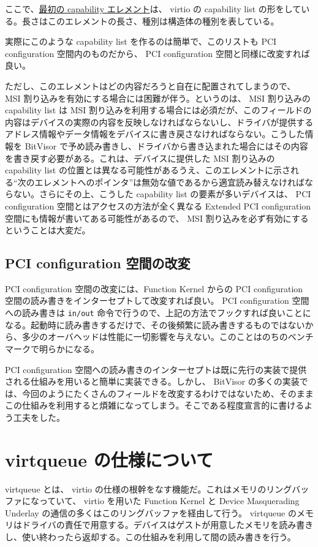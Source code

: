 \documentclass[a4paper,11pt,report]{ltjsbook}
\begin{document}
ここで、\hyperlink{cap1}{最初の capability エレメント}は、 virtio の capability list の形をしている。長さはこのエレメントの長さ、種別は構造体の種別を表している。

実際にこのような capability list を作るのは簡単で、このリストも PCI configuration 空間内のものだから、 PCI configuration 空間と同様に改変すれば良い。

ただし、このエレメントはどの内容だろうと自在に配置されてしまうので、 MSI 割り込みを有効にする場合には困難が伴う。というのは、 MSI 割り込みの capability list は MSI 割り込みを利用する場合には必須だが、このフィールドの内容はデバイスの実際の内容を反映しなければならないし、ドライバが提供するアドレス情報やデータ情報をデバイスに書き戻さなければならない。こうした情報を BitVisor で予め読み書きし、ドライバから書き込まれた場合にはその内容を書き戻す必要がある。これは、デバイスに提供した MSI 割り込みの capability list の位置とは異なる可能性があるうえ、このエレメントに示される``次のエレメントへのポインタ''は無効な値であるから適宜読み替えなければならない。さらにその上、こうした capability list の要素が多いデバイスは、 PCI configuration 空間とはアクセスの方法が全く異なる Extended PCI configuration 空間にも情報が書いてある可能性があるので、 MSI 割り込みを必ず有効にするということは大変だ。

\subsection{PCI configuration 空間の改変}

PCI configuration 空間の改変には、Function Kernel からの PCI configuration 空間の読み書きをインターセプトして改変すれば良い。 PCI configuration 空間への読み書きは \texttt{in/out} 命令で行うので、上記の方法でフックすれば良いことになる。起動時に読み書きするだけで、その後頻繁に読み書きするものではないから、多少のオーバヘッドは性能に一切影響を与えない。このことはのちのベンチマークで明らかになる。

PCI configuration 空間への読み書きのインターセプトは既に先行の実装\cite{bitvisor}で提供される仕組みを用いると簡単に実装できる。しかし、 BitVisor の多くの実装では、今回のようにたくさんのフィールドを改変するわけではないため、そのままこの仕組みを利用すると煩雑になってしまう。そこである程度宣言的に書けるよう工夫をした。

\section{virtqueue の仕様について}

virtqueue とは、 virtio の仕様の根幹をなす機能だ。これはメモリのリングバッファになっていて、 virtio を用いた Function Kernel と Device Masquerading Underlay の通信の多くはこのリングバッファを経由して行う。 virtqueue のメモリはドライバの責任で用意する。デバイスはゲストが用意したメモリを読み書きし、使い終わったら返却する。この仕組みを利用して間の読み書きを行う。
\end{document}
